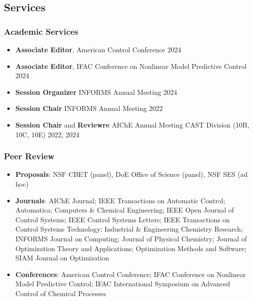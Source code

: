 \subsection*{Services}
\subsubsection*{Academic Services}
\begin{itemize}[leftmargin=*,itemsep=-1pt]
  \item[] \textbf{Associate Editor}, American Control Conference \hfill 2024
  \item[] \textbf{Associate Editor}, IFAC Conference on Nonlinear Model Predictive Control \hfill 2024
\item[] \textbf{Session Organizer} INFORMS Annual Meeting \hfill 2024
\item[] \textbf{Session Chair} INFORMS Annual Meeting \hfill 2022
\item[] \textbf{Session Chair} and \textbf{Reviewre} AIChE Annual Meeting CAST Division (10B, 10C, 10E) \hfill 2022, 2024
\end{itemize}

\subsubsection*{Peer Review}
\begin{itemize}[itemsep=1pt, parsep=0pt,leftmargin=*]
\item[] \textbf{Proposals}: NSF CBET (panel), DoE Office of Science (panel), NSF SES (ad hoc)
\item[] \textbf{Journals}: AIChE Journal; IEEE Transactions on Automatic Control; Automatica; Computers \& Chemical Engineering; IEEE Open Journal of Control Systems; IEEE Control Systems Letters; IEEE Transactions on Control Systems Technology; Industrial \& Engineering Chemistry Research; INFORMS Journal on Computing; Journal of Physical Chemistry; Journal of Optimization Theory and Applications; Optimization Methods and Software; SIAM Journal on Optimization
\item[] \textbf{Conferences}: American Control Conference; IFAC Conference on Nonlinear Model Predictive Control; IFAC International Symposium on Advanced Control of Chemical Processes 
\end{itemize}  
